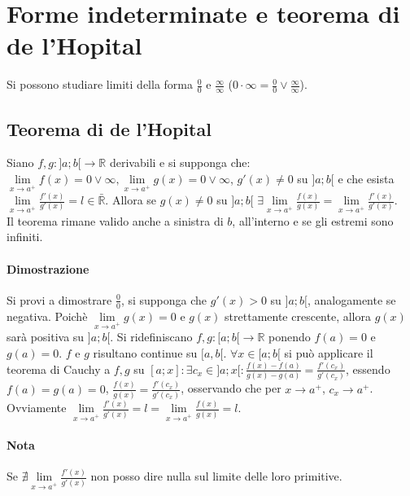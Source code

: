 \chapter{Forme indeterminate e teorema di de l'Hopital}
Si possono studiare limiti della forma $\frac{0}{0}$ e $\frac{\infty}{\infty}$ ($0\cdot\infty=\frac{0}{0}\lor \frac{\infty}{\infty}$).
\section{Teorema di de l'Hopital}
Siano $f,g:]a;b[\rightarrow\mathbb{R}$ derivabili e si supponga che: $\lim\limits_{x\rightarrow a^+}f(x)=0\lor \infty, \lim\limits_{x\rightarrow a^+}g(x)=0 \lor \infty$, $g'(x)
\neq 0$ su $]a;b[$ e che esista $\lim\limits_{x\rightarrow a^+}\frac{f'(x)}{g'(x)}=l\in\mathbb{\bar{R}}$. Allora se $g(x)\neq 0$ su $]a;b[$ $\exists\lim\limits_{x\rightarrow a^
+}\frac{f(x)}{g(x)}=\lim\limits_{x\rightarrow a^+}\frac{f'(x)}{g'(x)}$.\\
Il teorema rimane valido anche a sinistra di $b$, all'interno e se gli estremi sono infiniti.
\subsubsection{Dimostrazione}
Si provi a dimostrare $\frac{0}{0}$, si supponga che $g'(x)>0$ su $]a;b[$, analogamente se negativa. Poich\`e $\lim\limits_{x\rightarrow a^+}g(x)=0$ e $g(x)$ strettamente 
crescente, allora $g(x)$ sar\`a positiva su $]a;b[$. Si ridefiniscano $f,g:[a;b[\rightarrow\mathbb{R}$ ponendo $f(a)=0$ e $g(a)=0$. $f$ e $g$ risultano continue su $[a,b[$.
$\forall x\in [a;b[$ si pu\`o applicare il teorema di Cauchy a $f,g$ su $[a;x]:\exists c_x\in]a;x[:\frac{f(x)-f(a)}{g(x)-g(a)}=\frac{f'(c_x)}{g'(c_x)}$, essendo 
$f(a)=g(a)=0$, $\frac{f(x)}{g(x)}=\frac{f'(c_x)}{g'(c_x)}$, osservando che per $x\rightarrow a^+$, $c_x\rightarrow a^+$. Ovviamente $\lim\limits_{x\rightarrow a^+}
\frac{f'(x)}{g'(x)}=l=\lim\limits_{x\rightarrow a^+}\frac{f(x)}{g(x)}=l$.
\subsubsection{Nota}
Se $\nexists\lim\limits_{x\rightarrow a^+}\frac{f'(x)}{g'(x)}$ non posso dire nulla sul limite delle loro primitive.
